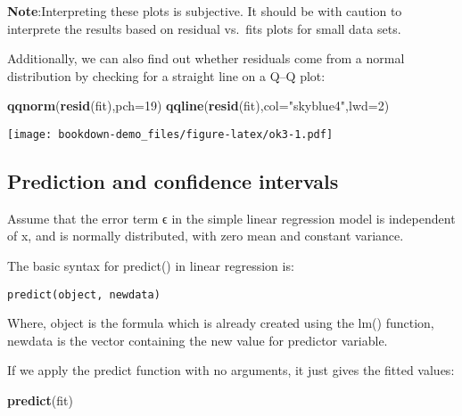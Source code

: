 \documentclass[]{book}
\newenvironment{Shaded}{\begin{snugshade}}{\end{snugshade}}
\newcommand{\KeywordTok}[1]{\textcolor[rgb]{0.13,0.29,0.53}{\textbf{#1}}}
\newcommand{\DataTypeTok}[1]{\textcolor[rgb]{0.13,0.29,0.53}{#1}}
\newcommand{\DecValTok}[1]{\textcolor[rgb]{0.00,0.00,0.81}{#1}}
\newcommand{\StringTok}[1]{\textcolor[rgb]{0.31,0.60,0.02}{#1}}
\newcommand{\NormalTok}[1]{#1}
\theoremstyle{definition}
\theoremstyle{definition}
\theoremstyle{definition}
\theoremstyle{remark}
\begin{document}
\textbf{Note}:Interpreting these plots is subjective. It should be with
caution to interprete the results based on residual vs.~fits plots for
small data sets.

Additionally, we can also find out whether residuals come from a normal
distribution by checking for a straight line on a Q--Q plot:

\begin{Shaded}
\begin{Highlighting}[]
\KeywordTok{qqnorm}\NormalTok{(}\KeywordTok{resid}\NormalTok{(fit),}\DataTypeTok{pch=}\DecValTok{19}\NormalTok{)}
\KeywordTok{qqline}\NormalTok{(}\KeywordTok{resid}\NormalTok{(fit),}\DataTypeTok{col=}\StringTok{"skyblue4"}\NormalTok{,}\DataTypeTok{lwd=}\DecValTok{2}\NormalTok{)}
\end{Highlighting}
\end{Shaded}

\texttt{[image: bookdown-demo\_files/figure-latex/ok3-1.pdf]}

\subsection{Prediction and confidence
intervals}\label{prediction-and-confidence-intervals}

Assume that the error term ϵ in the simple linear regression model is
independent of x, and is normally distributed, with zero mean and
constant variance.

The basic syntax for predict() in linear regression is:

\begin{verbatim}
predict(object, newdata)
\end{verbatim}

Where, object is the formula which is already created using the lm()
function, newdata is the vector containing the new value for predictor
variable.

If we apply the predict function with no arguments, it just gives the
fitted values:

\begin{Shaded}
\begin{Highlighting}[]
\KeywordTok{predict}\NormalTok{(fit)}
\end{Highlighting}
\end{Shaded}
\end{document}
